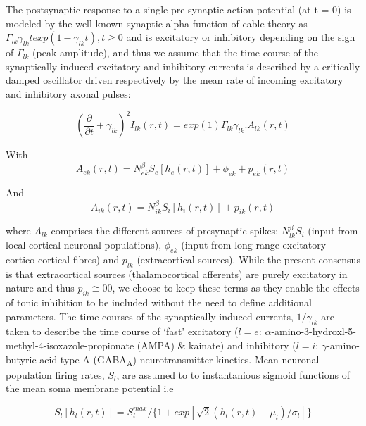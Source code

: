 \documentclass[a4paper,12pt]{article}
\begin{document}
The postsynaptic response to a single pre-synaptic action potential (at
t = 0) is modeled by the well-known synaptic alpha function of cable
theory as $\Gamma_{lk} \gamma_{lk}texp(1-\gamma_{lk}t), t \geq 0$ and is excitatory or inhibitory depending
on the sign of $\Gamma_{lk}$ (peak amplitude), and thus we assume that the time
course of the synaptically induced excitatory and inhibitory currents is
described by a critically damped oscillator driven respectively by the
mean rate of incoming excitatory and inhibitory axonal pulses:

\begin{equation} \label{eq:i_lk}
\left( \frac{\partial}{\partial t} + \gamma_{lk} \right)^2 I_{lk}(r,t) = exp(1)\Gamma_{lk}\gamma_{lk}.A_{lk}(r,t)
\end{equation}

With
\begin{equation} \label{eq:a_ek}
A_{ek}(r,t) = N_{ek}^{\beta} S_e[ h_e(r,t)] + \phi_{ek} + p_{ek}(r,t)
\end{equation}

And
\begin{equation} \label{eq:a_ik}
A_{ik}(r,t) = N_{ik}^{\beta} S_i[h_i(r,t)] + p_{ik}(r,t)
\end{equation}

where $A_{lk}$ comprises the different sources of presynaptic spikes: $N_{lk}^\beta S_i$ (input from local cortical
neuronal populations), $\phi_{ek}$ (input from long range excitatory cortico-cortical fibres) and $p_{lk}$
(extracortical sources).
While the present consensus is that extracortical sources
(thalamocortical afferents) are purely excitatory in nature and thus $p_{ik} \cong 0$0, we choose to keep these terms as
they enable the effects of
tonic inhibition to be included without the need to define additional
parameters. The time courses of the synaptically induced currents, $1 / \gamma_{lk}$ are taken to describe the time
course of ‘fast’ excitatory ($l = e$: $\alpha$-amino-3-hydroxl-5-methyl-4-isoxazole-propionate (AMPA) \& kainate) and
inhibitory ($l=i$: $\gamma$-amino-butyric-acid type A (GABA\textsubscript{A}) neurotransmitter kinetics. Mean neuronal
population firing rates, $S_l$, are assumed to to instantanious sigmoid functions of the mean soma membrane potential
i.e

\begin{equation} \label{eq:s_l}
S_l[h_l(r,t)]=S_l^{max}/\{1 + exp[\sqrt{2}(h_l(r,t)-\mu_l)/\sigma_l]\}
\end{equation}
\end{document}
